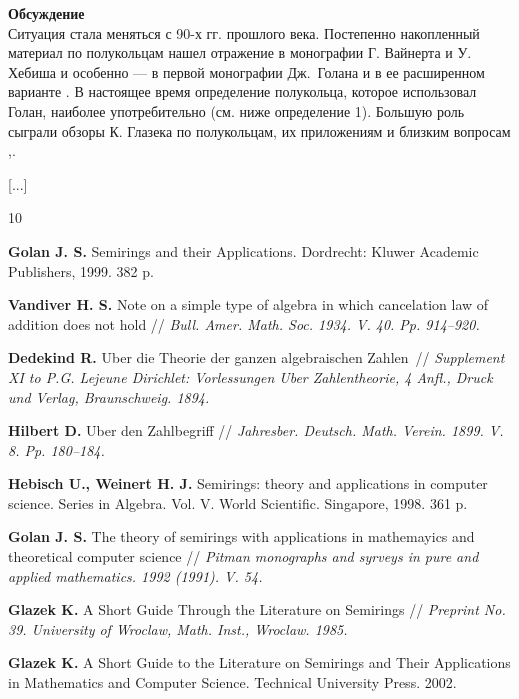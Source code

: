 \documentclass[a4paper,12pt]{book}
\begin{document}
\begin{paper}
		[...]
		
		\textbf{Обсуждение}\\
		Ситуация стала меняться с 90-х гг. прошлого века. Постепенно накопленный материал по полукольцам  нашел отражение в монографии Г. Вайнерта и У. Хебиша \cite{her_wei98} и особенно --- в первой монографии Дж.~Голана \cite{gol91} и в ее расширенном варианте \cite{golan99}. В настоящее время определение полукольца, которое использовал Голан, наиболее употребительно (см. ниже определение 1). Большую роль сыграли обзоры К. Глазека по полукольцам, их приложениям и близким вопросам  \cite{glaz85},\cite{gkaz00}.
		
		[...]
		
		\begin{thebibliography}{10}
			
			 \textbf{Golan J. S.} Semirings and their Applications. Dordrecht: Kluwer Academic Publishers, 1999. 382 p.
			
			    \textbf{Vandiver H. S.} Note on a simple type of algebra in which cancelation law of addition does not hold // \textit{Bull. Amer. Math. Soc. 1934. V. 40. Pp. 914--920.}
			
			 \textbf{Dedekind R.} Uber die Theorie der ganzen algebraischen Zahlen~// \textit{Supplement XI to P.G. Lejeune Dirichlet: Vorlessungen Uber Zahlentheorie, 4 Anfl., Druck und Verlag, Braunschweig. 1894.}
			
			 \textbf{Hilbert D.} Uber den Zahlbegriff // \textit{Jahresber. Deutsch. Math. Verein.  1899. V. 8. Pp. 180--184.}
			
			 \textbf{Hebisch U., Weinert H. J.} Semirings: theory and applications in computer science. Series in Algebra. Vol. V. World Scientific. Singapore, 1998. 361 p.
			
			 \textbf{Golan J. S.} The theory of semirings with applications in mathemayics and theoretical computer science // \textit{Pitman monographs and syrveys in pure and applied mathematics. 1992 (1991). V. 54.}
			
			 \textbf{Glazek K.} A Short Guide Through the Literature on Semirings // \textit{Preprint No. 39. University of Wroclaw, Math. Inst., Wroclaw.  1985.}
			
			 \textbf{Glazek K.} A Short Guide to the Literature on Semirings and Their Applications in Mathematics and Computer Science.  Technical University Press. 2002.
			

\end{thebibliography}
\end{paper}
\end{document}
